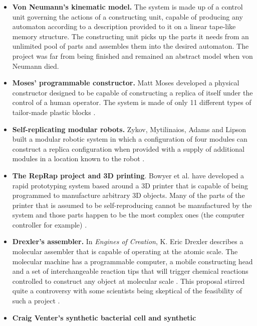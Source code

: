 \begin{itemize}
\item \textbf{Von Neumann’s kinematic model.} The system is made up of a
control unit governing the actions of a constructing unit, capable of
producing any automaton according to a description provided to it on a
linear tape-like memory structure. The constructing unit picks up the
parts it needs from an unlimited pool of parts and assembles them into
the desired automaton. The project was far from being finished and
remained an abstract model when von Neumann died.
\item \textbf{Moses' programmable constructor.} Matt Moses developed a physical constructor designed to be
capable of constructing a replica of itself under the control of a
human operator. The system is made of only 11 different types of
tailor-made plastic blocks \citep{moses2001}.
\item \textbf{Self-replicating modular robots.} Zykov, Mytilinaios,
Adams and Lipson built a modular robotic system in which a
configuration of four modules can construct a replica configuration
when provided with a supply of additional modules in a location known
to the robot \citep{zykovetal2005}.
\item \textbf{The RepRap project and 3D printing}. Bowyer et al.  have
developed a rapid prototyping system based around a 3D printer that is
capable of being programmed to manufacture arbitrary 3D objects. Many
of the parts of the printer that is assumed to be self-reproducing
cannot be manufactured by the system and those parts happen to be the
most complex ones (the computer controller for example) \citep{bowyer2007}.
\item \textbf{Drexler’s assembler.} In \textit{Engines of Creation}, K. Eric
Drexler describes a molecular assembler that is capable of operating at
the atomic scale. The molecular machine has a programmable computer, a
mobile constructing head and a set of interchangeable reaction tips
that will trigger chemical reactions controlled to construct any object
at molecular scale \citep{drexler1986}.
This proposal stirred quite a controversy with some
scientists being skeptical of the feasibility of such a project \citep{smalley2001}.
\item \textbf{Craig Venter’s synthetic bacterial cell and synthetic
}
\end{itemize}
